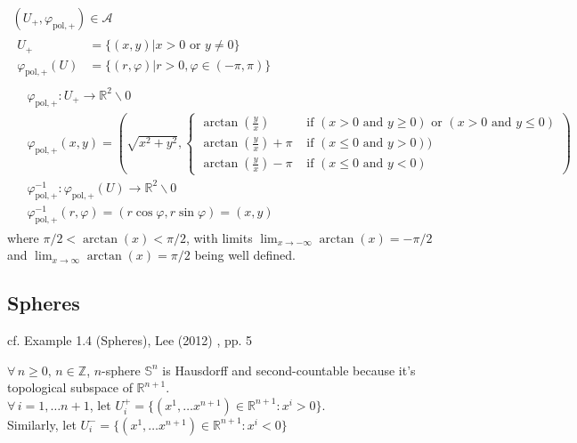 \begin{equation} \label{dgdt:Eq:UR22}
	\begin{gathered}
		(U_+, \varphi_{\text{pol},+}) \in \mathcal{A} \\ 
		\begin{aligned}
			U_+ & = \lbrace (x,y) | x>0 \text{ or } y \neq 0 \rbrace  \\
			\varphi_{\text{pol}, +}(U) & = \lbrace (r,\varphi) | r >0, \varphi \in (-\pi,\pi) \rbrace
		\end{aligned} \\
	 \begin{aligned}
			& \varphi_{\text{pol},+}:U_+ \to \mathbb{R}^2 \backslash 0 \\ 
			& \varphi_{\text{pol},+}(x,y) = ( \sqrt{x^2 + y^2}, \begin{cases} \arctan{ \left( \frac{y}{x} \right) }  & \text{ if } (x > 0 \text{ and } y \geq 0 ) \text{ or } (x > 0 \text{ and } y \leq 0) \\ \arctan{ \left( \frac{y}{x} \right) } + \pi & \text{ if } ( x \leq 0 \text{ and } y > 0)) \\
			\arctan{ \left( \frac{y}{x} \right) } - \pi & \text{ if } (x\leq 0 \text{ and } y < 0) \end{cases} ) \\ 
			& \varphi^{-1}_{\text{pol},+}: \varphi_{\text{pol},+}(U) \to \mathbb{R}^2\backslash 0 \\ 
			& \varphi^{-1}_{\text{pol},+}(r,\varphi) = (r\cos{\varphi}, r\sin{\varphi}) = (x,y)
		\end{aligned}
	\end{gathered}
\end{equation}
where $\pi/ 2 < \arctan(x) < \pi/ 2$, with limits $\lim_{x \to -\infty} \arctan(x) = -\pi/2$ and $\lim_{x \to \infty} \arctan(x) = \pi/2$ being well defined.



\subsection{Spheres}

cf. Example 1.4 (Spheres), Lee (2012) \cite{dgdt:JLee2012}, pp. 5

$\forall \, n \geq 0, \, n \in \mathbb{Z}$, $n$-sphere $\mathbb{S}^n$ is Hausdorff and second-countable because it's topological subspace of $\mathbb{R}^{n+1}$. \\
$\forall \, i = 1, \dots n +1$, let $U_i^+ = \lbrace (x^1, \dots x^{n+1}) \in \mathbb{R}^{n+1}: x^i > 0 \rbrace$. \\
Similarly, let $U_i^- = \lbrace (x^1, \dots x^{n+1})  \in \mathbb{R}^{n+1} : x^i < 0 \rbrace$  \\


